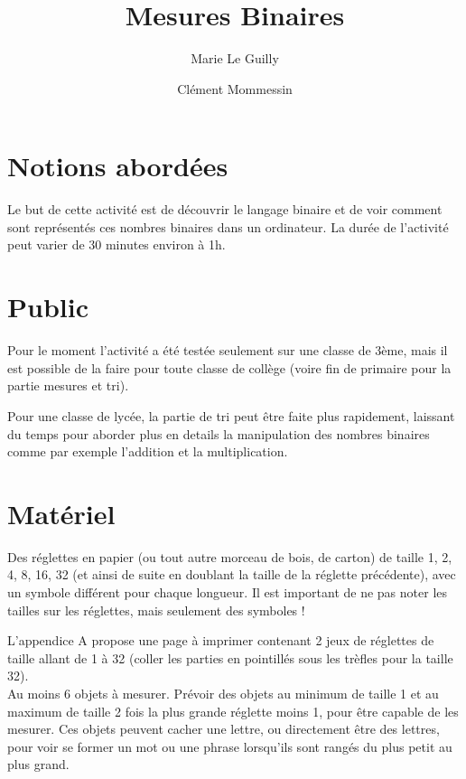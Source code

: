 \documentclass[a4paper,12pt]{scrartcl}
\begin{document}
\title{Mesures Binaires}
\author{Marie Le Guilly \and Clément Mommessin}

\maketitle

\section{Notions abordées}

Le but de cette activité est de découvrir le langage binaire et de voir comment sont représentés ces nombres binaires dans un ordinateur.
La durée de l'activité peut varier de 30 minutes environ à 1h.


\section{Public}

Pour le moment l'activité a été testée seulement sur une classe de 3ème, mais il est possible de la faire pour toute classe de collège (voire fin de primaire pour la partie mesures et tri).

Pour une classe de lycée, la partie de tri peut être faite plus rapidement, laissant du temps pour aborder plus en details la manipulation des nombres binaires comme par exemple l'addition et la multiplication.



\section{Matériel}

Des réglettes en papier (ou tout autre morceau de bois, de carton) de taille 1, 2, 4, 8, 16, 32 (et ainsi de suite en doublant la taille de la réglette précédente), avec un symbole différent pour chaque longueur. Il est important de ne pas noter les tailles sur les réglettes, mais seulement des symboles !

L'appendice A propose une page à imprimer contenant 2 jeux de réglettes de taille allant de 1 à 32 (coller les parties en pointillés sous les trèfles pour la taille 32).\\


Au moins 6 objets à mesurer. Prévoir des objets au minimum de taille 1 et au maximum de taille 2 fois la plus grande réglette moins 1, pour être capable de les mesurer.
%
Ces objets peuvent cacher une lettre, ou directement être des lettres, pour voir se former un mot ou une phrase lorsqu'ils sont rangés du plus petit au plus grand.
\end{document}
